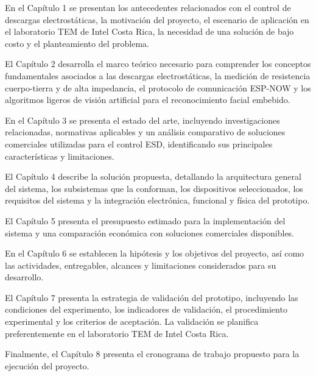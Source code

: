 En el Capítulo 1 se presentan los antecedentes relacionados con el control de descargas
electrostáticas, la motivación del proyecto, el escenario de aplicación en el laboratorio
TEM de Intel Costa Rica, la necesidad de una solución de bajo costo y el planteamiento
del problema.

El Capítulo 2 desarrolla el marco teórico necesario para comprender los conceptos
fundamentales asociados a las descargas electrostáticas, la medición de resistencia
cuerpo-tierra y de alta impedancia, el protocolo de comunicación ESP-NOW y los algoritmos
ligeros de visión artificial para el reconocimiento facial embebido.

En el Capítulo 3 se presenta el estado del arte, incluyendo investigaciones relacionadas,
normativas aplicables y un análisis comparativo de soluciones comerciales utilizadas para
el control ESD, identificando sus principales características y limitaciones.

El Capítulo 4 describe la solución propuesta, detallando la arquitectura general del
sistema, los subsistemas que la conforman, los dispositivos seleccionados, los requisitos
del sistema y la integración electrónica, funcional y física del prototipo.

El Capítulo 5 presenta el presupuesto estimado para la implementación del sistema y una
comparación económica con soluciones comerciales disponibles.

En el Capítulo 6 se establecen la hipótesis y los objetivos del proyecto, así como las
actividades, entregables, alcances y limitaciones considerados para su desarrollo.

El Capítulo 7 presenta la estrategia de validación del prototipo, incluyendo las
condiciones del experimento, los indicadores de validación, el procedimiento experimental
y los criterios de aceptación. La validación se planifica preferentemente en el laboratorio
TEM de Intel Costa Rica.

Finalmente, el Capítulo 8 presenta el cronograma de trabajo propuesto para la ejecución
del proyecto.
